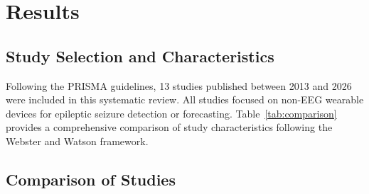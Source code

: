 
\section{Results}

\subsection{Study Selection and Characteristics}

Following the PRISMA guidelines, 13 studies published between 2013 and 2026 were included in this systematic review. All studies focused on non-EEG wearable devices for epileptic seizure detection or forecasting. Table~\ref{tab:comparison} provides a comprehensive comparison of study characteristics following the Webster and Watson \cite{webster2002} framework.

\subsection{Comparison of Studies}

